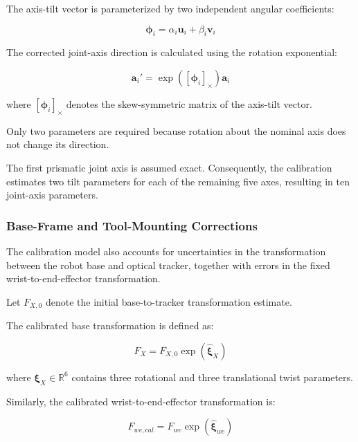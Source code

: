 \documentclass[11pt,letterpaper]{article}
\begin{document}
The axis-tilt vector is parameterized by two
independent angular coefficients:

\begin{equation}
\boldsymbol{\phi}_i
=
\alpha_i\mathbf{u}_i
+
\beta_i\mathbf{v}_i
\end{equation}

The corrected joint-axis direction is calculated using
the rotation exponential:

\begin{equation}
\boxed{
\mathbf{a}_i'
=
\exp\left(
[\boldsymbol{\phi}_i]_{\times}
\right)\mathbf{a}_i
}
\end{equation}

where $[\boldsymbol{\phi}_i]_{\times}$ denotes the
skew-symmetric matrix of the axis-tilt vector.

Only two parameters are required because rotation
about the nominal axis does not change its direction.

The first prismatic joint axis is assumed exact.
Consequently, the calibration estimates two tilt
parameters for each of the remaining five axes,
resulting in ten joint-axis parameters.


\subsubsection{Base-Frame and Tool-Mounting Corrections}

The calibration model also accounts for uncertainties
in the transformation between the robot base and
optical tracker, together with errors in the fixed
wrist-to-end-effector transformation.

Let $F_{X,0}$ denote the initial base-to-tracker
transformation estimate.

The calibrated base transformation is defined as:

\begin{equation}
\boxed{
F_X=
F_{X,0}
\exp\left(
\widehat{\boldsymbol{\xi}}_X
\right)
}
\end{equation}

where $\boldsymbol{\xi}_X\in\mathbb{R}^6$ contains
three rotational and three translational
twist parameters.

Similarly, the calibrated wrist-to-end-effector
transformation is:

\begin{equation}
\boxed{
F_{we,cal}
=
F_{we}
\exp\left(
\widehat{\boldsymbol{\xi}}_{we}
\right)
}
\end{equation}
\end{document}
